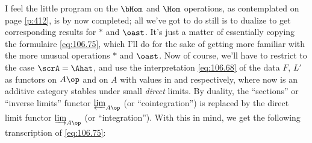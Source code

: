 I feel the little program on the $\bHom$ and $\Hom$ operations, as
contemplated on page \ref{p:412}, is by now completed; all we've got
to do still is to dualize to get corresponding results for $*$ and
$\oast$. It's just a matter of essentially copying the formulaire
\eqref{eq:106.75}, which I'll do for the sake of getting
more familiar with the more unusual operations $*$ and $\oast$. Now
of course, we'll have to restrict to the case $\scrA=\Ahat$, and use
the interpretation \eqref{eq:106.68} of the data $F$, $L'$ as functors
on $A\op$ and on $A$ with values in \scrM{} and \Ab{} respectively,
where now \scrM{} is an additive category stables under small
\emph{direct} limits. By duality, the ``sections'' or ``inverse
limits'' functor $\varprojlim_{A\op}$ (or ``cointegration'') is
replaced by the direct limit functor $\varinjlim_{A\op}$ (or
``integration''). With this in mind, we get the following
transcription of \eqref{eq:106.75}:
